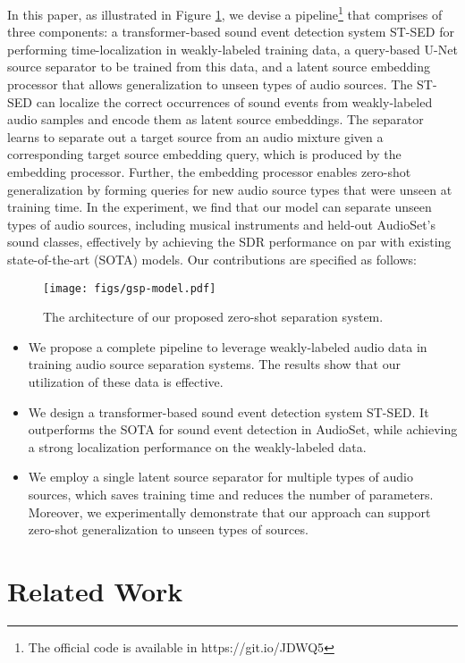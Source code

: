 \documentclass[letterpaper]{article} \usepackage{aaai22}  \usepackage{times}  \usepackage{helvet}  \usepackage{courier}  \usepackage[hyphens]{url}  \usepackage{graphicx} \urlstyle{rm} \def\UrlFont{\rm}  \usepackage{natbib}  \usepackage{caption} \DeclareCaptionStyle{ruled}{labelfont=normalfont,labelsep=colon,strut=off} \frenchspacing  \setlength{\pdfpagewidth}{8.5in}  \setlength{\pdfpageheight}{11in}  \usepackage{algorithm}
\begin{document}
In this paper, as illustrated in Figure \ref{fig:model_arch}, we devise a pipeline\footnote{The official code is available in https://git.io/JDWQ5} that comprises of three components: a transformer-based sound event detection system ST-SED for performing time-localization in weakly-labeled training data, a query-based U-Net source separator to be trained from this data, and a latent source embedding processor that allows generalization to unseen types of audio sources. The ST-SED can localize the correct occurrences of sound events from weakly-labeled audio samples and encode them as latent source embeddings. The separator learns to separate out a target source from an audio mixture given a corresponding target source embedding query, which is produced by the embedding processor. Further, the embedding processor enables zero-shot generalization by forming queries for new audio source types that were unseen at training time. In the experiment, we find that our model can separate unseen types of audio sources, including musical instruments and held-out AudioSet's sound classes, effectively by achieving the SDR performance on par with existing state-of-the-art (SOTA) models. Our contributions are specified as follows:
\begin{figure}[t]
    \centering
    \texttt{[image: figs/gsp-model.pdf]}
    \caption{The architecture of our proposed zero-shot separation system. }
    \label{fig:model_arch}
\vspace{-0.5cm}
\end{figure}

\begin{itemize}
    \item We propose a complete pipeline to leverage weakly-labeled audio data in training audio source separation systems. The results show that our utilization of these data is effective.
    \item We design a transformer-based sound event detection system ST-SED. It outperforms the SOTA for sound event detection in AudioSet, while achieving a strong localization performance on the weakly-labeled data.  
    \item We employ a single latent source separator for multiple types of audio sources, which saves training time and reduces the number of parameters. Moreover, we experimentally demonstrate that our approach can support zero-shot generalization to unseen types of sources.
\end{itemize}

\section{Related Work}
\end{document}
